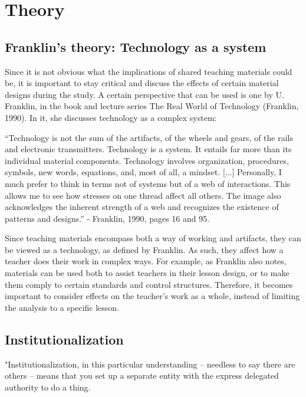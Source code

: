 \chapter{Theory}

\section{Franklin's theory: Technology as a system}
Since it is not obvious what the implications of shared teaching materials could be, it is
important to stay critical and discuss the effects of certain material designs during the study. A
certain perspective that can be used is one by U. Franklin, in the book and lecture series The
Real World of Technology (Franklin, 1990). In it, she discusses technology as a complex system:

“Technology is not the sum of the artifacts, of the wheels and gears, of the rails and
electronic transmitters. Technology is a system. It entails far more than its individual
material components. Technology involves organization, procedures, symbols, new
words, equations, and, most of all, a mindset. [...] Personally, I much prefer to think in
terms not of systems but of a web of interactions. This allows me to see how stresses on
one thread affect all others. The image also acknowledges the inherent strength of a
web and recognizes the existence of patterns and designs.” - Franklin, 1990, pages 16
and 95.

Since teaching materials encompass both a way of working and artifacts, they can be viewed
as a technology, as defined by Franklin. As such, they affect how a teacher does their work in
complex ways. For example, as Franklin also notes, materials can be used both to assist
teachers in their lesson design, or to make them comply to certain standards and control
structures. Therefore, it becomes important to consider effects on the teacher's work as a
whole, instead of limiting the analysis to a specific lesson.

\section{Institutionalization}
"Institutionalization, in this particular understanding -- needless to say there are others -- means that you set up a separate entity with the express delegated authority to do a thing.

